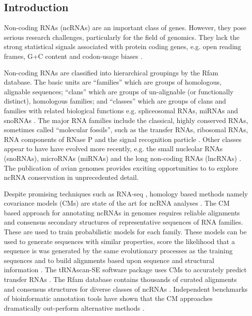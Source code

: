 \documentclass[10pt]{bmc_article}
\newenvironment{bmcformat}{\begin{raggedright}\baselineskip20pt\sloppy\setboolean{publ}{false}}{\end{raggedright}\baselineskip20pt\sloppy}
\begin{document}
\begin{bmcformat}



\section*{Introduction}

Non-coding RNAs (ncRNAs) are an important class of genes. However,
they pose serious research challenges, particularly for the field of
genomics. They lack the strong statistical signals associated with
protein coding genes, e.g. open reading frames, G+C content and
codon-usage biases \cite{Rivas:2000}.

Non-coding RNAs are classified into hierarchical groupings by the Rfam
database. The basic units are ``families'' which are groups of
homologous, alignable sequences; ``clans'' which are groups of
un-alignable (or functionally distinct), homologous families; and
``classes'' which are groups of clans and families with related
biological functions e.g. spliceosomal RNAs, miRNAs and snoRNAs
\cite{Griffiths-Jones:2003,Griffiths-Jones:2005,Gardner:2009,Gardner:2011a,Burge:2013}.
The major RNA families include the classical, highly conserved RNAs,
sometimes called ``molecular fossils'', such as the transfer RNAs,
ribosomal RNAs, RNA components of RNase P and the signal recognition
particle \cite{Jeffares:1998}. Other classes appear to have have
evolved more recently, e.g. the small nucleolar RNAs (snoRNAs),
microRNAs (miRNAs) and the long non-coding RNAs (lncRNAs)
\cite{Hoeppner:2012}. The publication of avian genomes provides
exciting opportunities to to explore ncRNA conservation in
unprecedented detail.

Despite promising techniques such as RNA-seq \cite{Croucher:2010},
homology based methods namely covariance models (CMs) are state of the
art for ncRNA analyses \cite{Sakakibara:1994,Eddy:1994,Nawrocki:2009}.
The CM based approach for annotating ncRNAs in genomes requires
reliable alignments and consensus secondary structures of
representative sequences of RNA families. These are used to train
probabilistic models for each family. These models can be used to
generate sequences with similar properties, score the likelihood that
a sequence is was generated by the same evolutionary processes as the
training sequences and to build alignments based upon sequence and
structural information \cite{Sakakibara:1994,Eddy:1994,Nawrocki:2009}.
The tRNAscan-SE software package uses CMs to accurately predict
transfer RNAs \cite{Lowe:1997,Chan:2009}. The Rfam database contains
thousands of curated alignments and consensus structures for diverse
classes of ncRNAs
\cite{Griffiths-Jones:2003,Griffiths-Jones:2005,Gardner:2009,Gardner:2011a,Burge:2013}.
Independent benchmarks of bioinformatic annotation tools have shown
that the CM approaches dramatically out-perform alternative methods
\cite{Freyhult:2007}.


\end{bmcformat}
\end{document}
